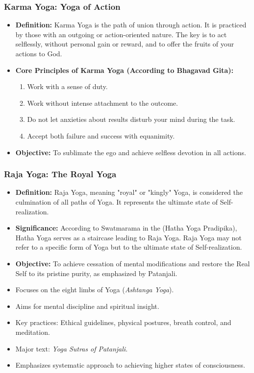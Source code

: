 \begin{frame}[fragile]\frametitle{Karma Yoga: Yoga of Action}
          \begin{itemize}
	  \item \textbf{Definition:} Karma Yoga is the path of union through action. It is practiced by those with an outgoing or action-oriented nature. The key is to act selflessly, without personal gain or reward, and to offer the fruits of your actions to God.

 
	  \item \textbf{Core Principles of Karma Yoga (According to Bhagavad Gita):}
    \begin{enumerate}
        \item Work with a sense of duty.
        \item Work without intense attachment to the outcome.
        \item Do not let anxieties about results disturb your mind during the task.
        \item Accept both failure and success with equanimity.
    \end{enumerate}

	  \item  \textbf{Objective:} To sublimate the ego and achieve selfless devotion in all actions.
	      \end{itemize}

\end{frame}

\begin{frame}[fragile]\frametitle{Raja Yoga: The Royal Yoga}
    
      \begin{itemize}
	  \item \textbf{Definition:} Raja Yoga, meaning "royal" or "kingly" Yoga, is considered the culmination of all paths of Yoga. It represents the ultimate state of Self-realization.
	  \item  \textbf{Significance:} According to Swatmarama in the  (Hatha Yoga Pradipika), Hatha Yoga serves as a staircase leading to Raja Yoga. Raja Yoga may not refer to a specific form of Yoga but to the ultimate state of Self-realization.
	  \item \textbf{Objective:} To achieve cessation of mental modifications and restore the Real Self to its pristine purity, as emphasized by Patanjali.
		\item Focuses on the eight limbs of Yoga (\textit{Ashtanga Yoga}).
		\item Aims for mental discipline and spiritual insight.
		\item Key practices: Ethical guidelines, physical postures, breath control, and meditation.
		\item Major text: \textit{Yoga Sutras of Patanjali}.
		\item Emphasizes systematic approach to achieving higher states of consciousness.
	  \end{itemize}
    
\end{frame}



